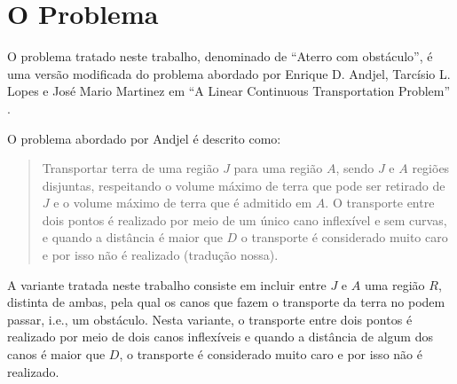 %
%
%

\section{O Problema}
O problema tratado neste trabalho, denominado de ``Aterro com obstáculo'', é uma
versão modificada do problema abordado por Enrique D. Andjel, Tarcísio L. Lopes
e José Mario Martinez em ``A Linear Continuous Transportation Problem''
\cite{Andjel:1989:TP}.

O problema abordado por Andjel é descrito como:
\begin{quotation}
    Transportar terra de uma região $J$ para uma região $A$, sendo $J$ e $A$
    regiões disjuntas, respeitando o volume máximo de terra que pode ser
    retirado de $J$ e o volume máximo de terra que é admitido em $A$. O
    transporte entre dois pontos é realizado por meio de um único cano
    inflexível e sem curvas, e quando a distância é maior que $D$ o
    transporte é considerado muito caro e por isso não é realizado (tradução
    nossa).
\end{quotation}

A variante tratada neste trabalho consiste em incluir entre $J$ e $A$ uma 
região $R$, distinta de ambas, pela qual os canos que fazem o transporte da
terra no podem passar, i.e., um obstáculo. Nesta variante, o transporte entre
dois pontos é realizado por meio de dois canos inflexíveis e quando a distância
de algum dos canos é maior que $D$, o transporte é considerado muito caro e por
isso não é realizado.
